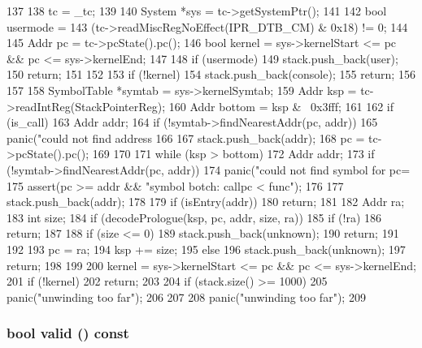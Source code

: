 \begin{DoxyCode}
137 {
138     tc = _tc;
139 
140     System *sys = tc->getSystemPtr();
141 
142     bool usermode =
143         (tc->readMiscRegNoEffect(IPR_DTB_CM) & 0x18) != 0;
144 
145     Addr pc = tc->pcState().pc();
146     bool kernel = sys->kernelStart <= pc && pc <= sys->kernelEnd;
147 
148     if (usermode) {
149         stack.push_back(user);
150         return;
151     }
152 
153     if (!kernel) {
154         stack.push_back(console);
155         return;
156     }
157 
158     SymbolTable *symtab = sys->kernelSymtab;
159     Addr ksp = tc->readIntReg(StackPointerReg);
160     Addr bottom = ksp & ~0x3fff;
161 
162     if (is_call) {
163         Addr addr;
164         if (!symtab->findNearestAddr(pc, addr))
165             panic("could not find address %
166 
167         stack.push_back(addr);
168         pc = tc->pcState().pc();
169     }
170 
171     while (ksp > bottom) {
172         Addr addr;
173         if (!symtab->findNearestAddr(pc, addr))
174             panic("could not find symbol for pc=%
175         assert(pc >= addr && "symbol botch: callpc < func");
176 
177         stack.push_back(addr);
178 
179         if (isEntry(addr))
180             return;
181 
182         Addr ra;
183         int size;
184         if (decodePrologue(ksp, pc, addr, size, ra)) {
185             if (!ra)
186                 return;
187 
188             if (size <= 0) {
189                 stack.push_back(unknown);
190                 return;
191             }
192 
193             pc = ra;
194             ksp += size;
195         } else {
196             stack.push_back(unknown);
197             return;
198         }
199 
200         kernel = sys->kernelStart <= pc && pc <= sys->kernelEnd;
201         if (!kernel)
202             return;
203 
204         if (stack.size() >= 1000)
205             panic("unwinding too far");
206     }
207 
208     panic("unwinding too far");
209 }
\end{DoxyCode}
\hypertarget{classAlphaISA_1_1StackTrace_a8d985300b138b6c5556ab17ed4df3b38}{
\subsubsection[{valid}]{\setlength{\rightskip}{0pt plus 5cm}bool valid () const}}
\label{classAlphaISA_1_1StackTrace_a8d985300b138b6c5556ab17ed4df3b38}



